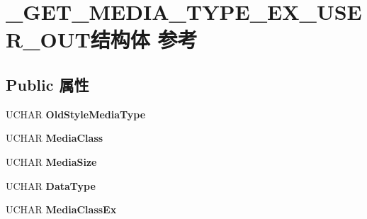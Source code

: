 \hypertarget{struct___g_e_t___m_e_d_i_a___t_y_p_e___e_x___u_s_e_r___o_u_t}{}\section{\+\_\+\+G\+E\+T\+\_\+\+M\+E\+D\+I\+A\+\_\+\+T\+Y\+P\+E\+\_\+\+E\+X\+\_\+\+U\+S\+E\+R\+\_\+\+O\+U\+T结构体 参考}
\label{struct___g_e_t___m_e_d_i_a___t_y_p_e___e_x___u_s_e_r___o_u_t}
\subsection*{Public 属性}
\begin{DoxyCompactItemize}
\item 
\mbox{\label{struct___g_e_t___m_e_d_i_a___t_y_p_e___e_x___u_s_e_r___o_u_t_abb415f819d8918ac7d30bfd9f74da9f7}} 
U\+C\+H\+AR {\bfseries Old\+Style\+Media\+Type}
\item 
\mbox{\label{struct___g_e_t___m_e_d_i_a___t_y_p_e___e_x___u_s_e_r___o_u_t_a3a33bab6826f2838a22e9e3278a13b9e}} 
U\+C\+H\+AR {\bfseries Media\+Class}
\item 
\mbox{\label{struct___g_e_t___m_e_d_i_a___t_y_p_e___e_x___u_s_e_r___o_u_t_a04607c188abc25eef5abed99a6d0a2bd}} 
U\+C\+H\+AR {\bfseries Media\+Size}
\item 
\mbox{\label{struct___g_e_t___m_e_d_i_a___t_y_p_e___e_x___u_s_e_r___o_u_t_aea15241869091d1dc9d2b51ed731ad96}} 
U\+C\+H\+AR {\bfseries Data\+Type}
\item 
\mbox{\label{struct___g_e_t___m_e_d_i_a___t_y_p_e___e_x___u_s_e_r___o_u_t_a066250bbf21e5c4574d679f90f3119bf}} 
U\+C\+H\+AR {\bfseries Media\+Class\+Ex}
\item 
\mbox{\label{struct___g_e_t___m_e_d_i_a___t_y_p_e___e_x___u_s_e_r___o_u_t_ac1a2e3de88d85017c5131b9dc27c0161}} 

\end{DoxyCompactItemize}
